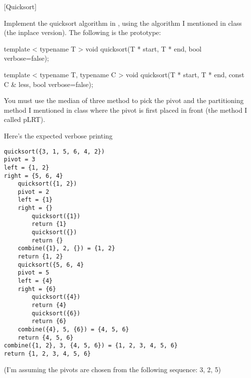 [Quicksort] 

Implement the quicksort algorithm in \cpp, using the 
algorithm I mentioned in class (the inplace version).
The following is the prototype:
\begin{console}[frame=single, fontsize=\footnotesize]
template < typename T >
void quicksort(T * start, T * end, bool verbose=false);

template < typename T, typename C >
void quicksort(T * start, T * end, const C & less, bool verbose=false);
\end{console}
You must use the median of three method to pick the pivot
and the partitioning
method I mentioned in class where the pivot is first placed in front
(the method I called pLRT).

Here's the expected verbose printing
\begin{Verbatim}[fontsize=\footnotesize,frame=single]
quicksort({3, 1, 5, 6, 4, 2})
pivot = 3
left = {1, 2}
right = {5, 6, 4}
    quicksort({1, 2})
    pivot = 2
    left = {1}
    right = {}
        quicksort({1})
        return {1}
        quicksort({})
        return {}
    combine({1}, 2, {}) = {1, 2}
    return {1, 2}
    quicksort({5, 6, 4}
    pivot = 5
    left = {4}
    right = {6}
        quicksort({4})
        return {4}
        quicksort({6})
        return {6} 
    combine({4}, 5, {6}) = {4, 5, 6}
    return {4, 5, 6}
combine({1, 2}, 3, {4, 5, 6}) = {1, 2, 3, 4, 5, 6}
return {1, 2, 3, 4, 5, 6}
\end{Verbatim}
(I'm assuming the pivots are chosen from the following sequence: 3, 2, 5)
